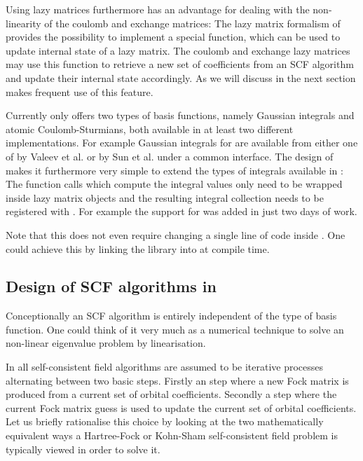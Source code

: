 Using lazy matrices furthermore has an advantage for
dealing with the non-linearity of the coulomb and exchange matrices:
The lazy matrix formalism of \lazyten provides the possibility
to implement a special \update function,
which can be used to update internal state of a lazy matrix.
The coulomb and exchange lazy matrices
may use this function to retrieve a new set of coefficients from an
SCF algorithm and update
their internal state accordingly.
As we will discuss in the next section \gscf makes frequent use of this feature.

Currently \gint only offers two types of basis functions,
namely Gaussian integrals and atomic Coulomb-Sturmians,
both available in at least two different implementations.
For example Gaussian integrals for \gint are available from either one of 
\libint by Valeev et al.\cite{Libint2,Libint2_231}
or \libcint by Sun et al. 
under a common interface.
The design of \gint makes it furthermore very simple to extend the types of integrals
available in \molsturm:
The function calls which compute the integral values only need to be wrapped
inside lazy matrix objects and the resulting integral collection needs to be registered
with \gint.
For example the support for \libcint was added in just two days of work.

Note that this does not even require changing a single line of code inside \gint.
One could achieve this by linking the library into \molsturm at compile time.

%
%
\subsection{Design of SCF algorithms in \gscf}
\label{sec:gscf}


%
%
Conceptionally an SCF algorithm is entirely independent of the type of basis function.
One could think of it very much as a numerical technique to solve
an non-linear eigenvalue problem by linearisation.
%
%


In \gscf all self-consistent field algorithms are assumed to be
iterative processes alternating between two basic steps.
Firstly an  step where a new Fock matrix is produced from a current set of
orbital coefficients.
Secondly a  step where the current Fock matrix guess
is used to update the current set of orbital coefficients.
Let us briefly rationalise this choice by 
looking at the two mathematically equivalent
ways a
Hartree-Fock or Kohn-Sham self-consistent field problem is typically
viewed in order to solve it.

